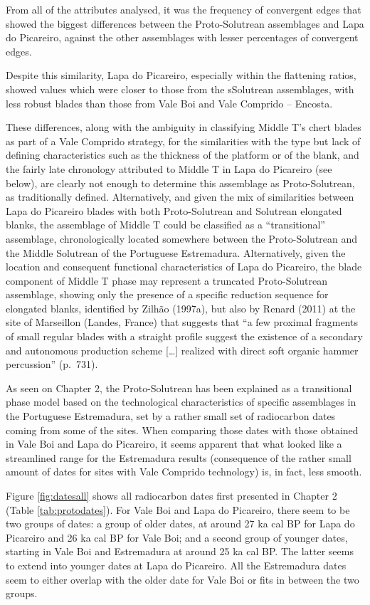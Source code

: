 \documentclass[12pt,twoside]{reedthesis}
\begin{document}
From all of the attributes analysed, it was the frequency of convergent edges that showed the biggest differences between the Proto-Solutrean assemblages and Lapa do Picareiro, against the other assemblages with lesser percentages of convergent edges.

Despite this similarity, Lapa do Picareiro, especially within the flattening ratios, showed values which were closer to those from the sSolutrean assemblages, with less robust blades than those from Vale Boi and Vale Comprido -- Encosta.

These differences, along with the ambiguity in classifying Middle T's chert blades as part of a Vale Comprido strategy, for the similarities with the type but lack of defining characteristics such as the thickness of the platform or of the blank, and the fairly late chronology attributed to Middle T in Lapa do Picareiro (see below), are clearly not enough to determine this assemblage as Proto-Solutrean, as traditionally defined. Alternatively, and given the mix of similarities between Lapa do Picareiro blades with both Proto-Solutrean and Solutrean elongated blanks, the assemblage of Middle T could be classified as a ``transitional'' assemblage, chronologically located somewhere between the Proto-Solutrean and the Middle Solutrean of the Portuguese Estremadura. Alternatively, given the location and consequent functional characteristics of Lapa do Picareiro, the blade component of Middle T phase may represent a truncated Proto-Solutrean assemblage, showing only the presence of a specific reduction sequence for elongated blanks, identified by Zilhão (1997a), but also by Renard (2011) at the site of Marseillon (Landes, France) that suggests that ``a few proximal fragments of small regular blades with a straight profile suggest the existence of a secondary and autonomous production scheme {[}\ldots{]} realized with direct soft organic hammer percussion'' (p.~731).

As seen on Chapter 2, the Proto-Solutrean has been explained as a transitional phase model based on the technological characteristics of specific assemblages in the Portuguese Estremadura, set by a rather small set of radiocarbon dates coming from some of the sites. When comparing those dates with those obtained in Vale Boi and Lapa do Picareiro, it seems apparent that what looked like a streamlined range for the Estremadura results (consequence of the rather small amount of dates for sites with Vale Comprido technology) is, in fact, less smooth.

Figure \ref{fig:datesall} shows all radiocarbon dates first presented in Chapter 2 (Table \ref{tab:protodates}). For Vale Boi and Lapa do Picareiro, there seem to be two groups of dates: a group of older dates, at around 27 ka cal BP for Lapa do Picareiro and 26 ka cal BP for Vale Boi; and a second group of younger dates, starting in Vale Boi and Estremadura at around 25 ka cal BP. The latter seems to extend into younger dates at Lapa do Picareiro. All the Estremadura dates seem to either overlap with the older date for Vale Boi or fits in between the two groups.
\end{document}
